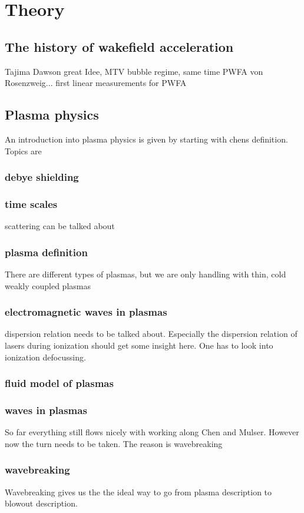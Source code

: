 \chapter{Theory}
\section{The history of wakefield acceleration}
Tajima Dawson great Idee, MTV bubble regime, same time PWFA von Rosenzweig... first linear measurements for PWFA
\section{Plasma physics}
An introduction into plasma physics is given by starting with chens definition. Topics are
\subsection{debye shielding}
\subsection{time scales}
scattering can be talked about

\subsection{plasma definition}
There are different types of plasmas, but we are only handling with thin, cold  weakly coupled plasmas
\subsection{electromagnetic waves in plasmas}
dispersion relation needs to be talked about. Especially the dispersion relation of lasers during ionization should get some insight here. One has to look into ionization defocussing.  
\subsection{fluid model of plasmas}
\subsection{waves in plasmas}
So far everything still flows nicely with working along Chen and Mulser. However now the turn needs to be taken.
The reason is wavebreaking
\subsection{wavebreaking}
Wavebreaking gives us the the ideal way to go from plasma description to blowout description.
